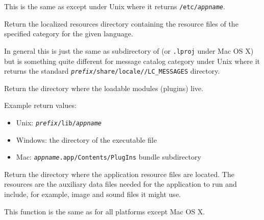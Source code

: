 This is the same as  except
under Unix where it returns \texttt{/etc/\textit{appname}}.


\label{wxstandardpathsgetlocalizedresourcesdir}


Return the localized resources directory containing the resource files of the
specified category for the given language.

In general this is just the same as  subdirectory of
 (or
\texttt{.lproj} under Mac OS X) but is something quite
different for message catalog category under Unix where it returns the standard
\texttt{\textit{prefix}/share/locale//LC\_MESSAGES} directory.



\label{wxstandardpathsgetpluginsdir}


Return the directory where the loadable modules (plugins) live.

Example return values:
\begin{itemize}
    \item Unix: \texttt{\textit{prefix}/lib/\textit{appname}}
    \item Windows: the directory of the executable file
    \item Mac: \texttt{\textit{appname}.app/Contents/PlugIns} bundle subdirectory
\end{itemize}




\label{wxstandardpathsgetresourcesdir}


Return the directory where the application resource files are located. The
resources are the auxiliary data files needed for the application to run and
include, for example, image and sound files it might use.

This function is the same as  for
all platforms except Mac OS X.

